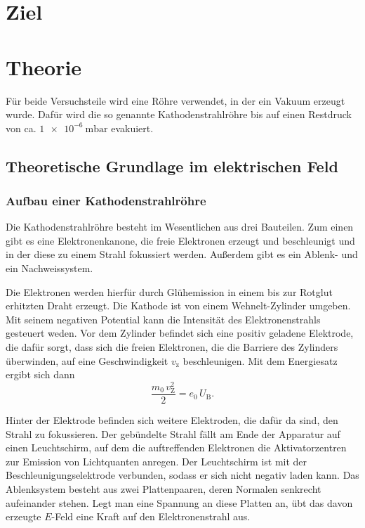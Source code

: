 \section{Ziel}

\section{Theorie}
\label{sec:Theorie}
Für beide Versuchsteile wird eine Röhre verwendet, in der ein
Vakuum erzeugt wurde. Dafür wird die so genannte Kathodenstrahlröhre 
bis auf einen Restdruck von ca. $\SI{1e-6}{\milli\bar}$
evakuiert. 

\subsection{Theoretische Grundlage im elektrischen Feld}

\subsubsection{Aufbau einer Kathodenstrahlröhre}
Die Kathodenstrahlröhre besteht im Wesentlichen aus drei 
Bauteilen. Zum einen gibt es eine Elektronenkanone, die freie 
Elektronen erzeugt und beschleunigt und in der diese zu einem 
Strahl fokussiert werden. Außerdem gibt es ein Ablenk- und 
ein Nachweissystem. 

\noindent Die Elektronen werden hierfür durch Glühemission in einem bis zur 
Rotglut erhitzten Draht erzeugt. 
Die Kathode ist von einem Wehnelt-Zylinder umgeben. Mit 
seinem negativen Potential kann die Intensität 
des Elektronenstrahls gesteuert weden. 
Vor dem Zylinder befindet sich eine positiv geladene 
Elektrode, die dafür sorgt, dass sich die freien Elektronen, 
die die Barriere des Zylinders überwinden, auf eine 
Geschwindigkeit $v_\text{z}$ beschleunigen. 
Mit dem Energiesatz ergibt sich dann 
\begin{equation}
    \frac{m_0 \, v_\text{Z}^2}{2} = e_\text{0} \, U_\text{B}.
    \label{eqn:energie}
\end{equation}

\noindent Hinter der Elektrode befinden sich weitere Elektroden, 
die dafür da sind, den Strahl zu fokussieren. Der gebündelte 
Strahl fällt am Ende der Apparatur auf einen Leuchtschirm, 
auf dem die auftreffenden Elektronen die Aktivatorzentren zur 
Emission von Lichtquanten anregen.
Der Leuchtschirm ist mit der Beschleunigungselektrode 
verbunden, sodass er sich nicht negativ laden kann.
Das Ablenksystem besteht aus zwei Plattenpaaren, deren Normalen 
senkrecht aufeinander stehen. Legt man eine Spannung an diese 
Platten an, übt das davon erzeugte $E$-Feld eine Kraft 
auf den Elektronenstrahl aus. 


